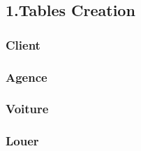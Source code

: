 \subsection*{1.Tables Creation}
\subsubsection*{Client}

\subsubsection*{Agence}

\subsubsection*{Voiture}

\newpage
\subsubsection*{Louer}

